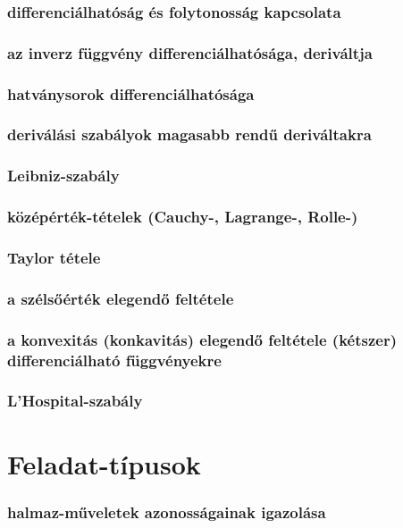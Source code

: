 \documentclass[12pt]{article}
\begin{document}
\subsubsection{differenciálhatóság és folytonosság kapcsolata}
\subsubsection{az inverz függvény differenciálhatósága, deriváltja}
\subsubsection{hatványsorok differenciálhatósága}
\subsubsection{deriválási szabályok magasabb rendű deriváltakra}
\subsubsection{Leibniz-szabály}
\subsubsection{középérték-tételek (Cauchy-, Lagrange-, Rolle-)}
\subsubsection{Taylor tétele}
\subsubsection{a
szélsőérték elegendő feltétele}
\subsubsection{a konvexitás (konkavitás) elegendő feltétele (kétszer)
differenciálható függvényekre}
\subsubsection{L’Hospital-szabály}


\section{Feladat-típusok}

\subsubsection{halmaz-műveletek azonosságainak igazolása}
\end{document}
